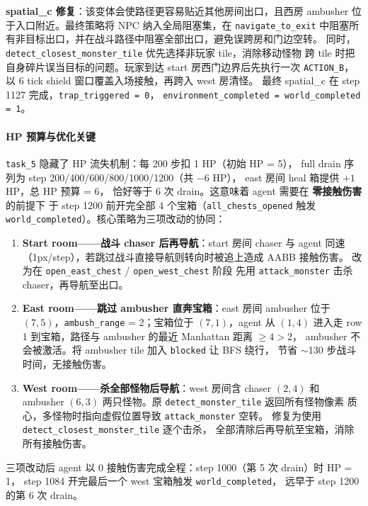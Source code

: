 \documentclass[12pt,a4paper]{ctexart}
\begin{document}
\textbf{spatial\_c 修复}：该变体会使路径更容易贴近其他房间出口，且西房 ambusher
位于入口附近。最终策略将 NPC 纳入全局阻塞集，在 \texttt{navigate\_to\_exit}
中阻塞所有非目标出口，并在战斗路径中阻塞全部出口，避免误跨房和门边空转。
同时，\texttt{detect\_closest\_monster\_tile} 优先选择非玩家 tile，消除移动怪物
跨 tile 时把自身碎片误当目标的问题。玩家到达 start 房西门边界后先执行一次
\texttt{ACTION\_B}，以 6 tick shield 窗口覆盖入场接触，再跨入 west 房清怪。
最终 spatial\_c 在 step 1127 完成，\texttt{trap\_triggered = 0}，
\texttt{environment\_completed = world\_completed = 1}。

\paragraph{HP 预算与优化关键}

\texttt{task\_5} 隐藏了 HP 流失机制：每 200 步扣 1 HP（初始 HP = 5），
full drain 序列为 step 200/400/600/800/1000/1200（共 $-$6 HP），
east 房间 heal 箱提供 $+1$ HP，总 HP 预算 = 6，
恰好等于 6 次 drain。这意味着 agent 需要在 \textbf{零接触伤害}的前提下
于 step 1200 前开完全部 4 个宝箱（\texttt{all\_chests\_opened} 触发
\texttt{world\_completed}）。核心策略为三项改动的协同：

\begin{enumerate}
  \item \textbf{Start room——战斗 chaser 后再导航}：start 房间 chaser 与 agent
  同速（1px/step），若跳过战斗直接导航则转向时被追上造成 AABB 接触伤害。
  改为在 \texttt{open\_east\_chest} / \texttt{open\_west\_chest} 阶段
  先用 \texttt{attack\_monster} 击杀 chaser，再导航至出口。
  \item \textbf{East room——跳过 ambusher 直奔宝箱}：east 房间 ambusher 位于
  $(7,5)$，\texttt{ambush\_range} = 2；宝箱位于 $(7,1)$，agent 从 $(1,4)$
  进入走 row 1 到宝箱，路径与 ambusher 的最近 Manhattan 距离 $\geq 4 > 2$，
  ambusher 不会被激活。将 ambusher tile 加入 \texttt{blocked} 让 BFS 绕行，
  节省 $\sim$130 步战斗时间，无接触伤害。
  \item \textbf{West room——杀全部怪物后导航}：west 房间含 chaser $(2,4)$ 和
  ambusher $(6,3)$ 两只怪物。原 \texttt{detect\_monster\_tile} 返回所有怪物像素
  质心，多怪物时指向虚假位置导致 \texttt{attack\_monster} 空转。
  修复为使用 \texttt{detect\_closest\_monster\_tile} 逐个击杀，
  全部清除后再导航至宝箱，消除所有接触伤害。
\end{enumerate}

三项改动后 agent 以 0 接触伤害完成全程：step 1000（第 5 次 drain）时 HP = 1，
step 1084 开完最后一个 west 宝箱触发 \texttt{world\_completed}，
远早于 step 1200 的第 6 次 drain。
\end{document}
